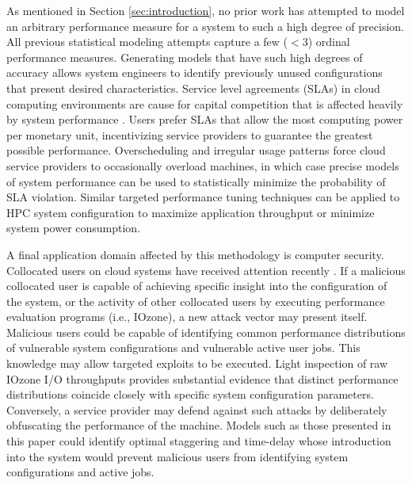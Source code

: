 \documentclass[letterpaper, 10 pt, conference]{ieeeconf}  %
\begin{document}
As mentioned in Section \ref{sec:introduction}, no prior work has attempted to model an arbitrary performance measure for a system to such a high degree of precision. All previous statistical modeling attempts capture a few ($<3$) ordinal performance measures. Generating models that have such high degrees of accuracy allows system engineers to identify previously unused configurations that present desired characteristics. Service level agreements (SLAs) in cloud computing environments are cause for capital competition that is affected heavily by system performance \cite{patel2009service}. Users prefer SLAs that allow the most computing power per monetary unit, incentivizing service providers to guarantee the greatest possible performance. Overscheduling and irregular usage patterns force cloud service providers to occasionally overload machines, in which case precise models of system performance can be used to statistically minimize the probability of SLA violation. Similar targeted performance tuning techniques can be applied to HPC system configuration to maximize application throughput or minimize system power consumption.

A final application domain affected by this methodology is computer security. Collocated users on cloud systems have received attention recently \cite{ali2015security}. If a malicious collocated user is capable of achieving specific insight into the configuration of the system, or the activity of other collocated users by executing performance evaluation programs (i.e., IOzone), a new attack vector may present itself. Malicious users could be capable of identifying common performance distributions of vulnerable system configurations and vulnerable active user jobs. This knowledge may allow targeted exploits to be executed. Light inspection of raw IOzone I/O throughputs provides substantial evidence that distinct performance distributions coincide closely with specific system configuration parameters. Conversely, a service provider may defend against such attacks by deliberately obfuscating the performance of the machine. Models such as those presented in this paper could identify optimal staggering and time-delay whose introduction into the system would prevent malicious users from identifying system configurations and active jobs.
\end{document}
